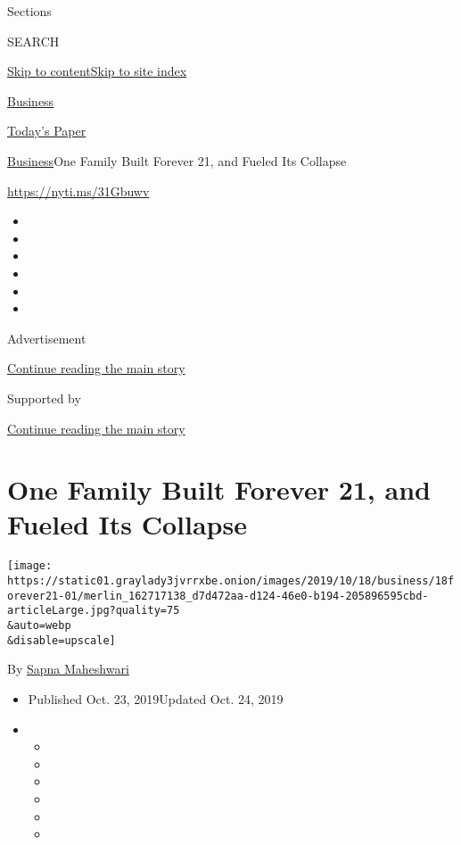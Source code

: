 Sections

SEARCH

\protect\hyperlink{site-content}{Skip to
content}\protect\hyperlink{site-index}{Skip to site index}

\href{https://www.nytimes3xbfgragh.onion/section/business}{Business}

\href{https://myaccount.nytimes3xbfgragh.onion/auth/login?response_type=cookie\&client_id=vi}{}

\href{https://www.nytimes3xbfgragh.onion/section/todayspaper}{Today's
Paper}

\href{/section/business}{Business}\textbar{}One Family Built Forever 21,
and Fueled Its Collapse

\url{https://nyti.ms/31Gbuwv}

\begin{itemize}
\item
\item
\item
\item
\item
\item
\end{itemize}

Advertisement

\protect\hyperlink{after-top}{Continue reading the main story}

Supported by

\protect\hyperlink{after-sponsor}{Continue reading the main story}

\hypertarget{one-family-built-forever-21-and-fueled-its-collapse}{%
\section{One Family Built Forever 21, and Fueled Its
Collapse}\label{one-family-built-forever-21-and-fueled-its-collapse}}

\texttt{[image: https://static01.graylady3jvrrxbe.onion/images/2019/10/18/business/18forever21-01/merlin\_162717138\_d7d472aa-d124-46e0-b194-205896595cbd-articleLarge.jpg?quality=75\\\&auto=webp\\\&disable=upscale]}

By \href{https://www.nytimes3xbfgragh.onion/by/sapna-maheshwari}{Sapna
Maheshwari}

\begin{itemize}
\item
  Published Oct. 23, 2019Updated Oct. 24, 2019
\item
  \begin{itemize}
  \item
  \item
  \item
  \item
  \item
  \item
  \end{itemize}
\end{itemize}

